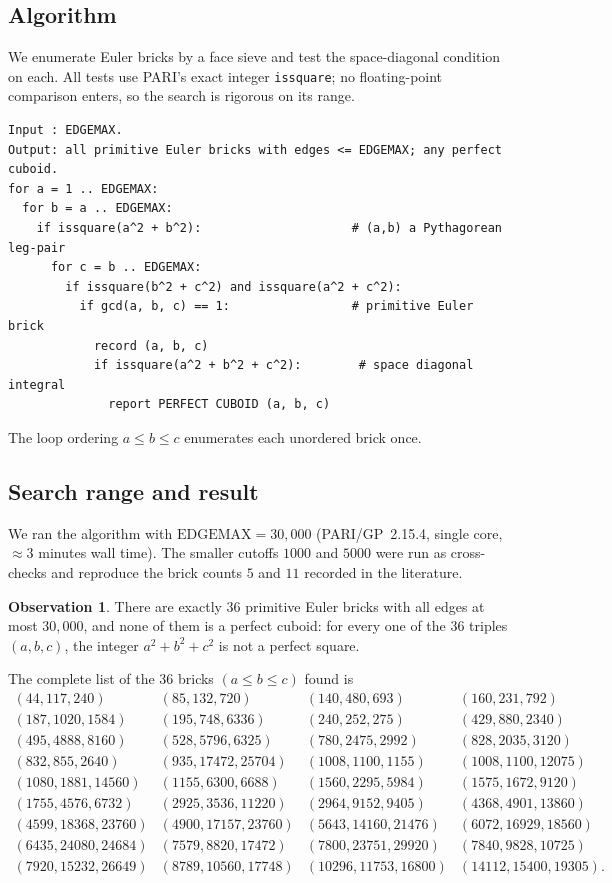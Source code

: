 \documentclass[11pt,reqno]{amsart}
\theoremstyle{plain}
\theoremstyle{definition}
\newtheorem{observation}[theorem]{Observation}
\theoremstyle{remark}
\begin{document}
\subsection*{Algorithm}
We enumerate Euler bricks by a face sieve and test the space-diagonal condition
on each. All tests use PARI's exact integer \texttt{issquare}; no floating-point
comparison enters, so the search is rigorous on its range.

\begin{verbatim}
Input : EDGEMAX.
Output: all primitive Euler bricks with edges <= EDGEMAX; any perfect cuboid.
for a = 1 .. EDGEMAX:
  for b = a .. EDGEMAX:
    if issquare(a^2 + b^2):                     # (a,b) a Pythagorean leg-pair
      for c = b .. EDGEMAX:
        if issquare(b^2 + c^2) and issquare(a^2 + c^2):
          if gcd(a, b, c) == 1:                 # primitive Euler brick
            record (a, b, c)
            if issquare(a^2 + b^2 + c^2):        # space diagonal integral
              report PERFECT CUBOID (a, b, c)
\end{verbatim}
The loop ordering $a\le b\le c$ enumerates each unordered brick once.

\subsection*{Search range and result}
We ran the algorithm with $\mathrm{EDGEMAX}=30{,}000$ (PARI/GP~2.15.4, single
core, $\approx 3$ minutes wall time). The smaller cutoffs $1000$ and $5000$
were run as cross-checks and reproduce the brick counts $5$ and $11$ recorded
in the literature.

\begin{observation}\label{obs:bricks}
There are exactly $36$ primitive Euler bricks with all edges at most $30{,}000$,
and none of them is a perfect cuboid: for every one of the $36$ triples
$(a,b,c)$, the integer $a^2+b^2+c^2$ is not a perfect square.
\end{observation}

The complete list of the $36$ bricks $(a\le b\le c)$ found is
\[
\begin{array}{llll}
(44,117,240) & (85,132,720) & (140,480,693) & (160,231,792) \\
(187,1020,1584) & (195,748,6336) & (240,252,275) & (429,880,2340) \\
(495,4888,8160) & (528,5796,6325) & (780,2475,2992) & (828,2035,3120) \\
(832,855,2640) & (935,17472,25704) & (1008,1100,1155) & (1008,1100,12075) \\
(1080,1881,14560) & (1155,6300,6688) & (1560,2295,5984) & (1575,1672,9120) \\
(1755,4576,6732) & (2925,3536,11220) & (2964,9152,9405) & (4368,4901,13860) \\
(4599,18368,23760) & (4900,17157,23760) & (5643,14160,21476) & (6072,16929,18560) \\
(6435,24080,24684) & (7579,8820,17472) & (7800,23751,29920) & (7840,9828,10725) \\
(7920,15232,26649) & (8789,10560,17748) & (10296,11753,16800) & (14112,15400,19305).
\end{array}
\]
\end{document}
